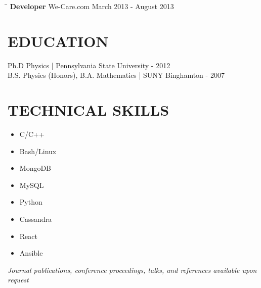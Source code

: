 \documentclass{res}
\begin{document}
\begin{resume}
\vspace{-12pt}
\begin{tabbing}
   \hspace{2.0in}\= \hspace{2.2in}\= \kill %
{\bf Developer} \> We-Care.com \> March 2013 - August 2013
\end{tabbing}\vspace{-15pt}


\section{EDUCATION}
    Ph.D Physics | Pennsylvania State University - 2012\\
    B.S. Physics (Honors), B.A. Mathematics | SUNY Binghamton - 2007\\
    \vspace{-2pt}

\section{TECHNICAL SKILLS}
\vspace{-1pt}
\begin{multicols}{4}
\begin{itemize}
\item C/C++
\item Bash/Linux
\item MongoDB
\item MySQL
\item Python
\item Cassandra
\item React
\item Ansible
\end{itemize}
\end{multicols}
\vspace{-12pt}
\begin{center}
\textit{Journal publications, conference proceedings, talks, and references available upon request}
\end{center}
\end{resume}
\end{document}
